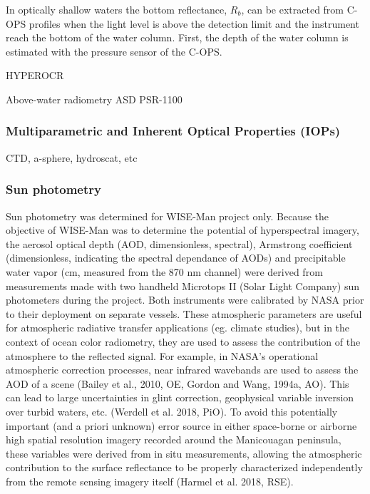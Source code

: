 \documentclass[essd, manuscript]{copernicus}
\begin{document}
In optically shallow waters the bottom reflectance, $R_b$,  can be extracted from C-OPS profiles when the light level is above the detection limit and the instrument reach the bottom of the water column. First, the depth of the water column is estimated with the pressure sensor of the C-OPS. 

HYPEROCR

Above-water radiometry
ASD
PSR-1100

\subsubsection{Multiparametric and Inherent Optical Properties (IOPs)}
CTD, a-sphere, hydroscat, etc

\subsubsection{Sun photometry}
Sun photometry was determined for WISE-Man project only. Because the objective of WISE-Man was to determine the potential of hyperspectral imagery, the aerosol optical depth (AOD, dimensionless, spectral), Armstrong coefficient (dimensionless, indicating the spectral dependance of AODs) and precipitable water vapor (cm, measured from the 870 nm channel) were derived from measurements made with two handheld Microtops II (Solar Light Company) sun photometers during the project. Both instruments were calibrated by NASA prior to their deployment on separate vessels. These atmospheric parameters are useful for atmospheric radiative transfer applications (eg. climate studies), but in the context of ocean color radiometry, they are used to assess the contribution of the atmosphere to the reflected signal. For example, in NASA’s operational atmospheric correction processes, near infrared wavebands are used to assess the AOD of a scene (Bailey et al., 2010, OE, Gordon and Wang, 1994a, AO). This can lead to large uncertainties in glint correction, geophysical variable inversion over turbid waters, etc. (Werdell et al. 2018, PiO). To avoid this potentially important (and a priori unknown) error source in either space-borne or airborne high spatial resolution imagery recorded around the Manicouagan peninsula, these variables were derived from in situ measurements, allowing the atmospheric contribution to the surface reflectance to be properly characterized independently from the remote sensing imagery itself (Harmel et al. 2018, RSE).
 
\end{document}
